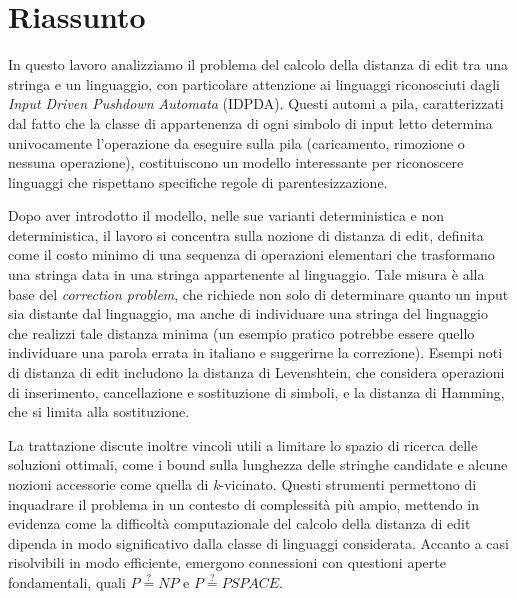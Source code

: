 \documentclass[a4paper,12pt]{article}
\begin{document}
    \section*{Riassunto}

    In questo lavoro analizziamo il problema del calcolo della distanza di edit tra una stringa e un linguaggio, con particolare attenzione ai linguaggi riconosciuti dagli \emph{Input Driven Pushdown Automata} (IDPDA).
    Questi automi a pila, caratterizzati dal fatto che la classe di appartenenza di ogni simbolo di input letto determina univocamente l’operazione da eseguire sulla pila (caricamento, rimozione o nessuna operazione), costituiscono un modello interessante per riconoscere linguaggi che rispettano specifiche regole di parentesizzazione.

    Dopo aver introdotto il modello, nelle sue varianti deterministica e non deterministica, il lavoro si concentra sulla nozione di distanza di edit, definita come il costo minimo di una sequenza di operazioni elementari che trasformano una stringa data in una stringa appartenente al linguaggio.
    Tale misura è alla base del \emph{correction problem}, che richiede non solo di determinare quanto un input sia distante dal linguaggio, ma anche di individuare una stringa del linguaggio che realizzi tale distanza minima (un esempio pratico potrebbe essere quello individuare una parola errata in italiano e suggerirne la correzione).
    Esempi noti di distanza di edit includono la distanza di Levenshtein, che considera operazioni di inserimento, cancellazione e sostituzione di simboli, e la distanza di Hamming, che si limita alla sostituzione.

    La trattazione discute inoltre vincoli utili a limitare lo spazio di ricerca delle soluzioni ottimali, come i bound sulla lunghezza delle stringhe candidate e alcune nozioni accessorie come quella di \emph{k}-vicinato.
    Questi strumenti permettono di inquadrare il problema in un contesto di complessità più ampio, mettendo in evidenza come la difficoltà computazionale del calcolo della distanza di edit dipenda in modo significativo dalla classe di linguaggi considerata.
    Accanto a casi risolvibili in modo efficiente, emergono connessioni con questioni aperte fondamentali, quali $P \stackrel{?}{=} NP$ e $P \stackrel{?}{=} PSPACE$.
\end{document}
